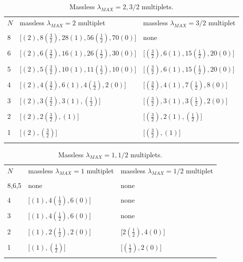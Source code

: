\documentclass[a4paper,12pt]{article}
\begin{document}
\begin{table}[p]
\begin{center}
\begin{tabular} {|l|l|l|}
\cline{1-3}  $N$&massless $\lambda_{MAX}=2$  multiplet& massless
$\lambda_{MAX}=3/2$ multiplet
\\ \cline{1-3}&&\\
8&$\bigl[(2),8(\frac{3}{2}), 28(1), 56(\frac{1}{2}),
70(0)\bigr]$&none\\&&\\ 6&$\bigl[(2),6(\frac{3}{2}), 16(1),
26(\frac{1}{2}), 30(0)\bigr]$& $\bigl[(\frac{3}{2}), 6(1),
15(\frac{1}{2}), 20(0)\bigr]$\\&&\\ 5&$\bigl[(2),5(\frac{3}{2}),
10(1), 11(\frac{1}{2}), 10(0)\bigr]$& $\bigl[(\frac{3}{2}), 6(1),
15(\frac{1}{2}), 20(0)\bigr]$\\&&\\ 4&$\bigl[(2),4(\frac{3}{2}),
6(1), 4(\frac{1}{2}), 2(0)\bigr]$& $\bigl[(\frac{3}{2}), 4(1),
7(\frac{1}{2}), 8(0)\bigr]$\\&&\\ 3&$\bigl[(2),3(\frac{3}{2}),
3(1), (\frac{1}{2})\bigr]$& $\bigl[(\frac{3}{2}), 3(1),
3(\frac{1}{2}), 2(0)\bigr]$\\&&\\
2&$\bigl[(2),2(\frac{3}{2}),(1)\bigr]$& $\bigl[(\frac{3}{2}),
2(1), (\frac{1}{2})\bigr]$\\&&\\
1&$\bigl[(2),(\frac{3}{2})\bigr]$& $\bigl[(\frac{3}{2}),
(1)\bigr]$\\&&
\\\cline{1-3}
\end{tabular}
\caption{Massless $\lambda_{MAX}=2,3/2$
multiplets.}\label{hel23/2}
\end{center}
\end{table}

\begin{table}[p]
\begin{center}
\begin{tabular} {|l|l|l|}
\cline{1-3}  $N$& massless $\lambda_{MAX}=1$  multiplet &
massless $\lambda_{MAX}=1/2$  multiplet
\\ \cline{1-3}&&\\
8,6,5&none&none\\&&\\ 4&$\bigl[(1),4(\frac{1}{2}), 6(0)\bigr]$&
none\\&&\\ 3&$\bigl[(1),4(\frac{1}{2}), 6(0)\bigr]$& none\\&&\\
2&$\bigl[(1),2(\frac{1}{2}), 2(0)\bigr]$& $\bigl[2(\frac{1}{2}),
4(0)\bigr]$\\&&\\ 1&$\bigl[(1),(\frac{1}{2})\bigr]$&
$\bigl[(\frac{1}{2}), 2(0)\bigr]$\\&&\\ \cline{1-3}
\end{tabular}
\caption{Massless $\lambda_{MAX}=1,1/2$
multiplets.}\label{hel11/2}
\end{center}
\end{table}
\end{document}
